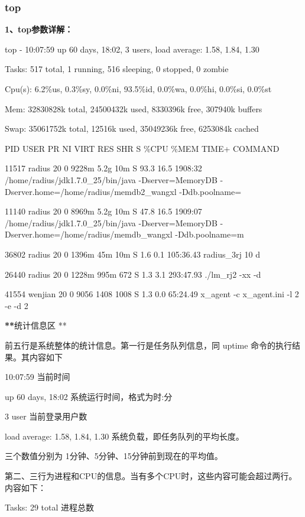 \documentclass[letterpaper,10pt]{sphinxmanual}
\begin{document}
\subsubsection{top}
\label{Linux_pro_mana/tools:top}
\textbf{1、top参数详解：}

top - 10:07:59 up 60 days, 18:02,  3 users,  load average: 1.58, 1.84, 1.30

Tasks: 517 total,   1 running, 516 sleeping,   0 stopped,   0 zombie

Cpu(s):  6.2\%us,  0.3\%sy,  0.0\%ni, 93.5\%id,  0.0\%wa,  0.0\%hi,  0.0\%si,  0.0\%st

Mem:  32830828k total, 24500432k used,  8330396k free,   307940k buffers

Swap: 35061752k total,    12516k used, 35049236k free,  6253084k cached

PID USER        PR  NI  VIRT    RES   SHR   S  \%CPU  \%MEM    TIME+  COMMAND

11517 radius    20   0  9228m   5.2g  10m   S  93.3  16.5   1908:32 /home/radius/jdk1.7.0\_25/bin/java -Dserver=MemoryDB -Dserver.home=/home/radius/memdb2\_wangxl -Ddb.poolname=

11140 radius    20   0  8969m   5.2g   10m  S  47.8  16.5   1909:07 /home/radius/jdk1.7.0\_25/bin/java -Dserver=MemoryDB -Dserver.home=/home/radius/memdb\_wangxl -Ddb.poolname=m

36802 radius    20   0  1396m   45m   10m   S  1.6   0.1    105:36.43 radius\_3rj 10 d

26440 radius    20   0  1228m   995m   672  S  1.3   3.1    293:47.93 ./lm\_rj2 -xx -d

41554 wenjian   20   0  9056   1408   1008  S  1.3   0.0   65:24.49 x\_agent -c x\_agent.ini -l 2 -e -d 2

{\color{red}\bfseries{}**}统计信息区 **

前五行是系统整体的统计信息。第一行是任务队列信息，同 uptime 命令的执行结果。其内容如下

10:07:59  当前时间

up  60 days, 18:02 系统运行时间，格式为时:分

3 user 当前登录用户数

load average: 1.58, 1.84, 1.30 系统负载，即任务队列的平均长度。

三个数值分别为 1分钟、5分钟、15分钟前到现在的平均值。

第二、三行为进程和CPU的信息。当有多个CPU时，这些内容可能会超过两行。内容如下：

Tasks: 29 total 进程总数
\end{document}
